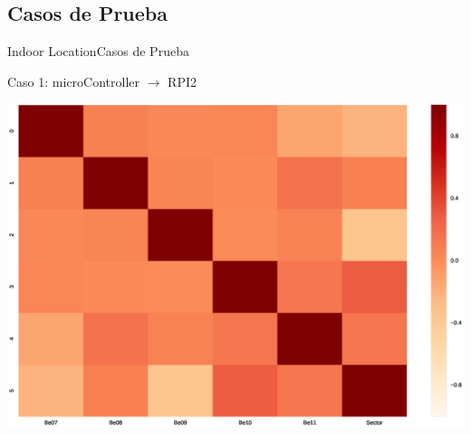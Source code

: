 \documentclass[10pt]{beamer}
\begin{document}
\subsection{Casos de Prueba}
\begin{frame}{Indoor Location}{Casos de Prueba}
\begin{block}{Caso 1: microController $\rightarrow$ RPI2}
\begin{multicols}{2}
\includegraphics[scale=0.3]{AAUgraphics/correlationCon.eps}
\end{multicols}
\end{block}
\end{frame}
\end{document}
